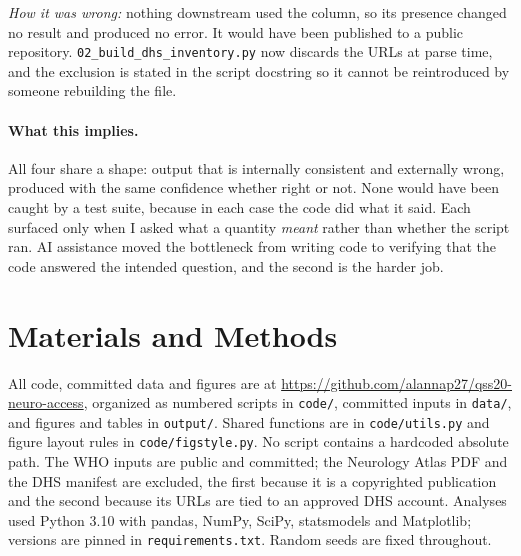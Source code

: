 \documentclass[10pt]{article}
\begin{document}
\emph{How it was wrong:} nothing downstream used the column, so its presence
changed no result and produced no error. It would have been published to a
public repository. \texttt{02\_build\_dhs\_inventory.py} now discards the URLs
at parse time, and the exclusion is stated in the script docstring so it cannot
be reintroduced by someone rebuilding the file.

\paragraph{What this implies.} All four share a shape: output that is internally
consistent and externally wrong, produced with the same confidence whether right
or not. None would have been caught by a test suite, because in each case the
code did what it said. Each surfaced only when I asked what a quantity
\emph{meant} rather than whether the script ran. AI assistance moved the
bottleneck from writing code to verifying that the code answered the intended
question, and the second is the harder job.

\section*{Materials and Methods}

All code, committed data and figures are at
\url{https://github.com/alannap27/qss20-neuro-access}, organized as numbered
scripts in \texttt{code/}, committed inputs in \texttt{data/}, and figures and
tables in \texttt{output/}. Shared functions are in \texttt{code/utils.py} and
figure layout rules in \texttt{code/figstyle.py}. No script contains a hardcoded
absolute path. The WHO inputs are public and committed; the Neurology Atlas PDF
and the DHS manifest are excluded, the first because it is a copyrighted
publication and the second because its URLs are tied to an approved DHS account.
Analyses used Python 3.10 with pandas, NumPy, SciPy, statsmodels and Matplotlib;
versions are pinned in \texttt{requirements.txt}. Random seeds are fixed
throughout.



\end{document}
